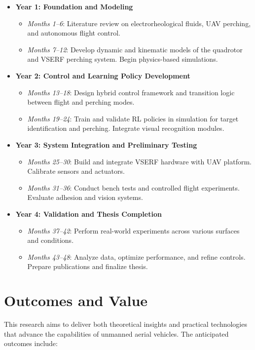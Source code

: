 \documentclass[11pt,a4paper]{article}
\begin{document}
\begin{itemize}
\item \textbf{Year 1: Foundation and Modeling}
\begin{itemize}
\item \textit{Months 1--6}: Literature review on electrorheological fluids, UAV perching, and autonomous flight control.
\item \textit{Months 7--12}: Develop dynamic and kinematic models of the quadrotor and VSERF perching system. Begin physics-based simulations.
\end{itemize}

\item \textbf{Year 2: Control and Learning Policy Development}
\begin{itemize}
\item \textit{Months 13--18}: Design hybrid control framework and transition logic between flight and perching modes.
\item \textit{Months 19--24}: Train and validate RL policies in simulation for target identification and perching. Integrate visual recognition modules.
\end{itemize}

\item \textbf{Year 3: System Integration and Preliminary Testing}
\begin{itemize}
\item \textit{Months 25--30}: Build and integrate VSERF hardware with UAV platform. Calibrate sensors and actuators.
\item \textit{Months 31--36}: Conduct bench tests and controlled flight experiments. Evaluate adhesion and vision systems.
\end{itemize}

\item \textbf{Year 4: Validation and Thesis Completion}
\begin{itemize}
\item \textit{Months 37--42}: Perform real-world experiments across various surfaces and conditions.
\item \textit{Months 43--48}: Analyze data, optimize performance, and refine controls. Prepare publications and finalize thesis.
\end{itemize}
\end{itemize}

\section{Outcomes and Value}
This research aims to deliver both theoretical insights and practical technologies that advance the capabilities of unmanned aerial vehicles. The anticipated outcomes include:
\end{document}
